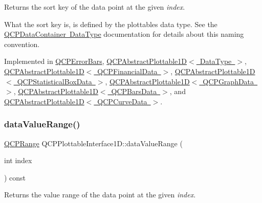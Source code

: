 Returns the sort key of the data point at the given {\itshape index}.

What the sort key is, is defined by the plottable\textquotesingle{}s data type. See the \mbox{\hyperlink{class_q_c_p_data_container_qcpdatacontainer-datatype}{Q\+C\+P\+Data\+Container Data\+Type}} documentation for details about this naming convention. 

Implemented in \mbox{\hyperlink{class_q_c_p_error_bars_a3000a036124880a90c629d124c1cd1e2}{Q\+C\+P\+Error\+Bars}}, \mbox{\hyperlink{class_q_c_p_abstract_plottable1_d_aa8277da921b009bce474437d50b4a2d8}{Q\+C\+P\+Abstract\+Plottable1\+D$<$ Data\+Type $>$}}, \mbox{\hyperlink{class_q_c_p_abstract_plottable1_d_aa8277da921b009bce474437d50b4a2d8}{Q\+C\+P\+Abstract\+Plottable1\+D$<$ Q\+C\+P\+Financial\+Data $>$}}, \mbox{\hyperlink{class_q_c_p_abstract_plottable1_d_aa8277da921b009bce474437d50b4a2d8}{Q\+C\+P\+Abstract\+Plottable1\+D$<$ Q\+C\+P\+Statistical\+Box\+Data $>$}}, \mbox{\hyperlink{class_q_c_p_abstract_plottable1_d_aa8277da921b009bce474437d50b4a2d8}{Q\+C\+P\+Abstract\+Plottable1\+D$<$ Q\+C\+P\+Graph\+Data $>$}}, \mbox{\hyperlink{class_q_c_p_abstract_plottable1_d_aa8277da921b009bce474437d50b4a2d8}{Q\+C\+P\+Abstract\+Plottable1\+D$<$ Q\+C\+P\+Bars\+Data $>$}}, and \mbox{\hyperlink{class_q_c_p_abstract_plottable1_d_aa8277da921b009bce474437d50b4a2d8}{Q\+C\+P\+Abstract\+Plottable1\+D$<$ Q\+C\+P\+Curve\+Data $>$}}.

\mbox{\label{class_q_c_p_plottable_interface1_d_a9ca7fcf14d885a200879768679b19be9}} 
\subsubsection{\texorpdfstring{dataValueRange()}{dataValueRange()}}
{\footnotesize\ttfamily \mbox{\hyperlink{class_q_c_p_range}{Q\+C\+P\+Range}} Q\+C\+P\+Plottable\+Interface1\+D\+::data\+Value\+Range (\begin{DoxyParamCaption}\item[{int}]{index }\end{DoxyParamCaption}) const\hspace{0.3cm}{\ttfamily [pure virtual]}}

Returns the value range of the data point at the given {\itshape index}.

